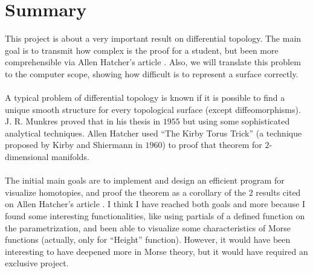 %

\chapter{Summary}
This project is about a very important result on differential topology. The main goal is to transmit how complex is the proof for a student, but been more comprehensible via Allen Hatcher's article \cite{arXiv:1312.3518}. Also, we will translate this problem to the computer scope, showing how difficult is to represent a surface correctly.\\
\\A typical problem of differential topology is known if it is possible to find a unique smooth structure for every topological surface (except diffeomorphisms). J. R. Munkres proved that in his thesis in $1955$ but using some sophisticated analytical techniques. Allen Hatcher used ``The Kirby Torus Trick'' (a technique proposed by Kirby and Shiermann in $1960$) to proof that theorem for $2$-dimensional manifolds.\\
\\The initial main goals are to implement and design an efficient program for visualize homotopies, and proof the theorem as a corollary of the $2$ results cited on Allen Hatcher's article \cite{arXiv:1312.3518}. I think I have reached both goals and more because I found some interesting functionalities, like using partials of a defined function on the parametrization, and been able to visualize some characteristics of Morse functions (actually, only for ``Height'' function). However, it would have been interesting to have deepened more in Morse theory, but it would have required an exclusive project.\\

